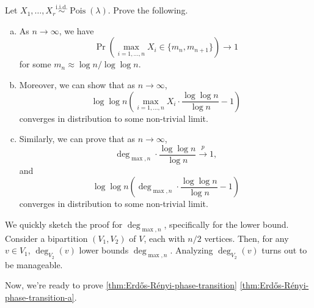 \begin{exercise}
	Let \(X_1, \dots , X_r \overset{\text{i.i.d.} }{\sim } \operatorname{Pois}(\lambda ) \). Prove the following.
	\begin{enumerate}[(a)]
		\item As \(n \to \infty \), we have
		      \[
			      \Pr_{}(\max _{i = 1, \dots , n} X_i \in \{ m_n, m_{n+1} \} )
			      \to 1
		      \]
		      for some \(m_n \approx \log n / \log \log n\).
		\item Moreover, we can show that as \(n \to \infty \),
		      \[
			      \log \log n \left( \max _{i = 1, \dots , n} X_i \cdot \frac{\log \log n}{\log n} - 1 \right)
		      \]
		      converges in distribution to some non-trivial limit.
		\item Similarly, we can prove that as \(n \to \infty \),
		      \[
			      \deg _{\max , n} \cdot \frac{\log \log n}{\log n}
			      \overset{p}{\to} 1,
		      \]
		      and
		      \[
			      \log \log n \left( \deg _{\max , n} \cdot \frac{\log \log n}{\log n} - 1\right)
		      \]
		      converges in distribution to some non-trivial limit.
	\end{enumerate}
\end{exercise}
\begin{answer}
	We quickly sketch the proof for \(\deg _{\max , n}\), specifically for the lower bound. Consider a bipartition \((V_1, V_2)\) of \(V\), each with \(n / 2\) vertices. Then, for any \(v \in V_1\), \(\deg _{V_2}(v)\) lower bounds \(\deg _{\max , n}\). Analyzing \(\deg _{V_2}(v)\) turns out to be manageable.
\end{answer}

Now, we're ready to prove \autoref{thm:Erdős-Rényi-phase-transition} \autoref{thm:Erdős-Rényi-phase-transition-a}.

